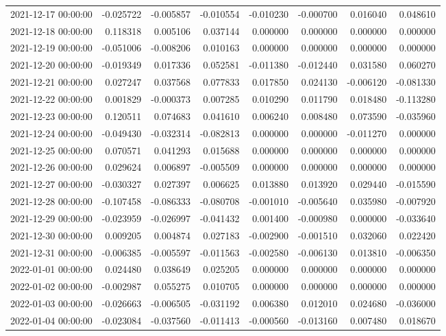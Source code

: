 \begin{tabular}{lrrrrrrr}
2021-12-17 00:00:00 & -0.025722 & -0.005857 & -0.010554 & -0.010230 & -0.000700 & 0.016040 & 0.048610 \\
2021-12-18 00:00:00 & 0.118318 & 0.005106 & 0.037144 & 0.000000 & 0.000000 & 0.000000 & 0.000000 \\
2021-12-19 00:00:00 & -0.051006 & -0.008206 & 0.010163 & 0.000000 & 0.000000 & 0.000000 & 0.000000 \\
2021-12-20 00:00:00 & -0.019349 & 0.017336 & 0.052581 & -0.011380 & -0.012440 & 0.031580 & 0.060270 \\
2021-12-21 00:00:00 & 0.027247 & 0.037568 & 0.077833 & 0.017850 & 0.024130 & -0.006120 & -0.081330 \\
2021-12-22 00:00:00 & 0.001829 & -0.000373 & 0.007285 & 0.010290 & 0.011790 & 0.018480 & -0.113280 \\
2021-12-23 00:00:00 & 0.120511 & 0.074683 & 0.041610 & 0.006240 & 0.008480 & 0.073590 & -0.035960 \\
2021-12-24 00:00:00 & -0.049430 & -0.032314 & -0.082813 & 0.000000 & 0.000000 & -0.011270 & 0.000000 \\
2021-12-25 00:00:00 & 0.070571 & 0.041293 & 0.015688 & 0.000000 & 0.000000 & 0.000000 & 0.000000 \\
2021-12-26 00:00:00 & 0.029624 & 0.006897 & -0.005509 & 0.000000 & 0.000000 & 0.000000 & 0.000000 \\
2021-12-27 00:00:00 & -0.030327 & 0.027397 & 0.006625 & 0.013880 & 0.013920 & 0.029440 & -0.015590 \\
2021-12-28 00:00:00 & -0.107458 & -0.086333 & -0.080708 & -0.001010 & -0.005640 & 0.035980 & -0.007920 \\
2021-12-29 00:00:00 & -0.023959 & -0.026997 & -0.041432 & 0.001400 & -0.000980 & 0.000000 & -0.033640 \\
2021-12-30 00:00:00 & 0.009205 & 0.004874 & 0.027183 & -0.002900 & -0.001510 & 0.032060 & 0.022420 \\
2021-12-31 00:00:00 & -0.006385 & -0.005597 & -0.011563 & -0.002580 & -0.006130 & 0.013810 & -0.006350 \\
2022-01-01 00:00:00 & 0.024480 & 0.038649 & 0.025205 & 0.000000 & 0.000000 & 0.000000 & 0.000000 \\
2022-01-02 00:00:00 & -0.002987 & 0.055275 & 0.010705 & 0.000000 & 0.000000 & 0.000000 & 0.000000 \\
2022-01-03 00:00:00 & -0.026663 & -0.006505 & -0.031192 & 0.006380 & 0.012010 & 0.024680 & -0.036000 \\
2022-01-04 00:00:00 & -0.023084 & -0.037560 & -0.011413 & -0.000560 & -0.013160 & 0.007480 & 0.018670 \\

\end{tabular}
